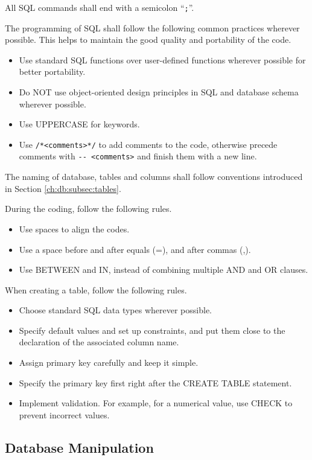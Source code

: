 All SQL commands shall end with a semicolon ``\verb|;|''.

The programming of SQL shall follow the following common practices wherever possible. This helps to maintain the good quality and portability of the code.
\begin{itemize}
	\item Use standard SQL functions over user-defined functions wherever possible for better portability.
	\item Do NOT use object-oriented design principles in SQL and database schema wherever possible.
	\item Use UPPERCASE for keywords.
	\item Use \verb|/*<comments>*/| to add comments to the code, otherwise precede comments with \verb|-- <comments>| and finish them with a new line.
\end{itemize}

The naming of database, tables and columns shall follow conventions introduced in Section \ref{ch:db:subsec:tables}.

During the coding, follow the following rules.
\begin{itemize}
	\item Use spaces to align the codes.
	\item Use a space before and after equals (=), and after commas (,).
	\item Use BETWEEN and IN, instead of combining multiple AND and OR clauses.
\end{itemize}

When creating a table, follow the following rules.
\begin{itemize}
	\item Choose standard SQL data types wherever possible.
	\item Specify default values and set up constraints, and put them close to the declaration of the associated column name.
	\item Assign primary key carefully and keep it simple.
	\item Specify the primary key first right after the CREATE TABLE statement.
	\item Implement validation. For example, for a numerical value, use CHECK to prevent incorrect values.
\end{itemize}

\subsection{Database Manipulation}

